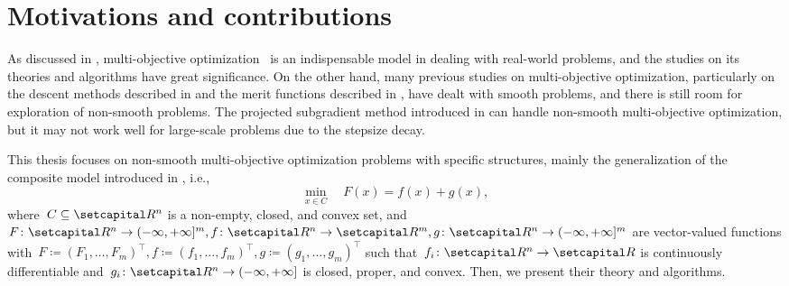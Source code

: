 \documentclass[../main]{subfiles}
\begin{document}
\section{Motivations and contributions} 
As discussed in , multi-objective optimization~ is an indispensable model in dealing with real-world problems, and the studies on its theories and algorithms have great significance.
On the other hand, many previous studies on multi-objective optimization, particularly on the descent methods described in  and the merit functions described in , have dealt with smooth problems, and there is still room for exploration of non-smooth problems.
The projected subgradient method introduced in  can handle non-smooth multi-objective optimization, but it may not work well for large-scale problems due to the stepsize decay.

This thesis focuses on non-smooth multi-objective optimization problems with specific structures, mainly the generalization of the composite model introduced in , i.e.,
\begin{equation} \label{eq:composite_MO}
    \min_{x \in C} \quad F(x) = f(x) + g(x)
    ,\end{equation}
where~$C \subseteq \setR^n$ is a non-empty, closed, and convex set, and~$F \colon \setR^n \to (-\infty, +\infty]^m, f \colon \setR^n \to \setR^m, g \colon \setR^n \to (-\infty, +\infty]^m$ are vector-valued functions with~$F \coloneqq (F_1, \dots, F_m)^\top, f \coloneqq (f_1, \dots, f_m)^\top, g \coloneqq (g_1, \dots, g_m)^\top$ such that~$f_i \colon \setR^n \to \setR$ is continuously differentiable and~$g_i \colon \setR^n \to (-\infty, +\infty]$ is closed, proper, and convex.
Then, we present their theory and algorithms.
\end{document}
